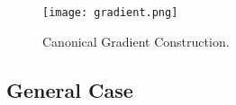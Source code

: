\begin{figure}[h!]
    \centering
    \texttt{[image: gradient.png]}
    \caption{Canonical Gradient Construction.}
    \label{fig:gradient}
\end{figure}


\subsection{General Case}






















